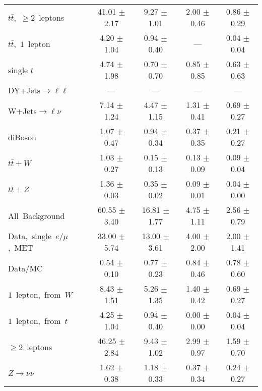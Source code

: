 \documentclass{article}
\begin{document}
\begin{longtable}{|l|c|c|c|c|}
$t\bar{t}$,~$\ge2$~leptons & 41.01 $\pm$ 2.17  & 9.27 $\pm$ 1.01  & 2.00 $\pm$ 0.46  & 0.86 $\pm$ 0.29 \\* 
$t\bar{t}$,~$1$~lepton & 4.20 $\pm$ 1.04  & 0.94 $\pm$ 0.40  & ---  & 0.04 $\pm$ 0.04 \\* 
single $t$  & 4.74 $\pm$ 1.98  & 0.70 $\pm$ 0.70  & 0.85 $\pm$ 0.85  & 0.63 $\pm$ 0.63 \\* 
DY+Jets$\rightarrow\ell\ell$  & ---  & ---  & ---  & --- \\* 
W+Jets$\rightarrow\ell\nu$  & 7.14 $\pm$ 1.24  & 4.47 $\pm$ 1.15  & 1.31 $\pm$ 0.41  & 0.69 $\pm$ 0.27 \\* 
diBoson  & 1.07 $\pm$ 0.47  & 0.94 $\pm$ 0.34  & 0.37 $\pm$ 0.35  & 0.21 $\pm$ 0.27 \\* 
$t\bar{t}+W$  & 1.03 $\pm$ 0.27  & 0.15 $\pm$ 0.13  & 0.13 $\pm$ 0.09  & 0.09 $\pm$ 0.04 \\* 
$t\bar{t}+Z$  & 1.36 $\pm$ 0.03  & 0.35 $\pm$ 0.02  & 0.09 $\pm$ 0.01  & 0.04 $\pm$ 0.00 \\* 
\hline \hline 
All~Background  & 60.55 $\pm$ 3.40  & 16.81 $\pm$ 1.77  & 4.75 $\pm$ 1.11  & 2.56 $\pm$ 0.79 \\* 
Data,~single~$e/\mu$,~MET  & 33.00 $\pm$ 5.74  & 13.00 $\pm$ 3.61  & 4.00 $\pm$ 2.00  & 2.00 $\pm$ 1.41 \\* 
Data/MC  & 0.54 $\pm$ 0.10  & 0.77 $\pm$ 0.23  & 0.84 $\pm$ 0.46  & 0.78 $\pm$ 0.60 \\* 
\hline \hline 
$1$~lepton,~from~$W$  & 8.43 $\pm$ 1.51  & 5.26 $\pm$ 1.35  & 1.40 $\pm$ 0.42  & 0.69 $\pm$ 0.27 \\* 
$1$~lepton,~from~$t$  & 4.25 $\pm$ 1.04  & 0.94 $\pm$ 0.40  & 0.00 $\pm$ 0.00  & 0.04 $\pm$ 0.04 \\* 
$\ge2$~leptons  & 46.25 $\pm$ 2.84  & 9.43 $\pm$ 1.02  & 2.99 $\pm$ 0.97  & 1.59 $\pm$ 0.70 \\* 
$Z\rightarrow\nu\nu$  & 1.62 $\pm$ 0.38  & 1.18 $\pm$ 0.33  & 0.37 $\pm$ 0.34  & 0.24 $\pm$ 0.27 \\* 
\hline 
\end{longtable} 

 
 
 
 
\pagebreak 

 
 
 
 
\end{document}
